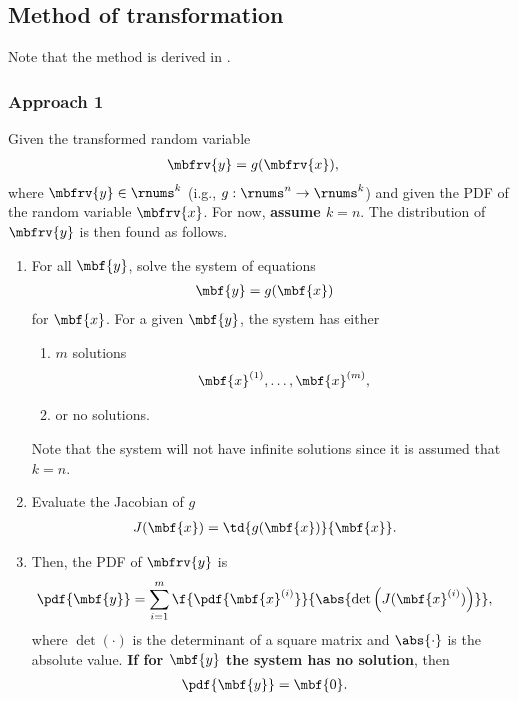 \subsection{Method of transformation}
Note that the method is derived in \cite[Sec.~2.6.2]{murphy_machine_2012}. 
\subsubsection{Approach 1}
\label{sec: MV method of transformation approach 1}
\begin{myBlackBox}
    Given the transformed random variable    
    \begin{align}
        \mbfrv{y} &= g(\mbfrv{x}),
    \end{align}
    where $\mbfrv{y}\in\rnums^{k}$ (i.g., $g:\rnums^{n}\to\rnums^{k}$) and given the PDF of the random variable $\mbfrv{x}$. For now, \textbf{assume $k=n$}. The distribution of $\mbfrv{y}$ is then found as follows.
    \begin{enumerate}
        \item For all $\mbf{y}$, solve the system of equations
        \begin{align}
            \mbf{y} &= g(\mbf{x})
        \end{align}
        for $\mbf{x}$. For a given $\mbf{y}$, the system has either
        \begin{enumerate}
            \item $m$ solutions
            \begin{align}
                \mbf{x}^{(1)}, \ldots, \mbf{x}^{(m)},
            \end{align}
            \item or no solutions.
        \end{enumerate}
        Note that the system will not have infinite solutions since it is assumed that $k=n$.
        \item Evaluate the Jacobian of $g$
        \begin{align}
            J(\mbf{x})                         
            &= \td{g(\mbf{x})}{\mbf{x}}.
        \end{align}
        \item Then, the PDF of $\mbfrv{y}$ is
        \begin{align}
            \pdf{\mbf{y}} &= 
            \sum_{i=1}^{m} \f{\pdf{\mbf{x}^{(i)}}}{\abs{\operatorname{det}\left(J(\mbf{x}^{(i)})\right)}},
        \end{align}
        where $\operatorname{det}(\cdot)$ is the determinant of a square matrix and $\abs{\cdot}$ is the absolute value. \textbf{If for $\mbf{y}$ the system has no solution}, then 
        \begin{align}
            \pdf{\mbf{y}} &= \mbf{0}.
        \end{align}
    \end{enumerate}
\end{myBlackBox}
